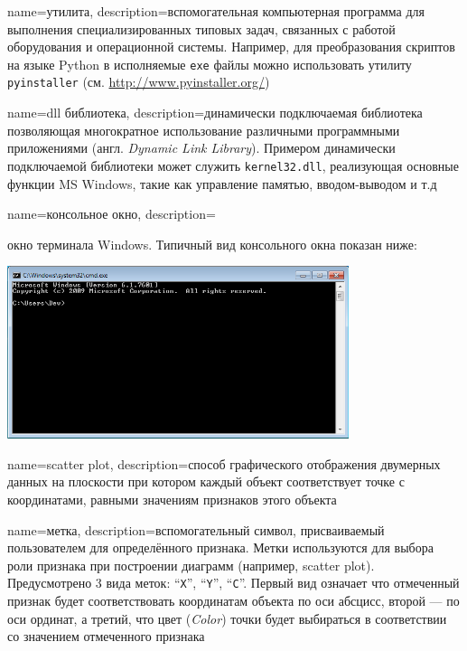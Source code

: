 {
	name=утилита,
	description={вспомогательная компьютерная программа для выполнения специализированных типовых задач, связанных с работой оборудования и операционной системы. Например, для преобразования скриптов на языке Python в исполняемые \texttt{exe} файлы можно использовать утилиту \texttt{pyinstaller} (см. \url{http://www.pyinstaller.org/})}
}

{
	name=dll библиотека,
	description={динамически подключаемая библиотека позволяющая многократное использование различными программными приложениями (англ. \textit{Dynamic Link Library}). Примером динамически подключаемой библиотеки может служить \texttt{kernel32.dll}, реализующая основные функции MS Windows, такие как управление памятью, вводом-выводом и т.д}
}

{
	name=консольное окно,
	description={окно терминала Windows. Типичный вид консольного окна показан ниже:
	\newline\begin{center}
		\includegraphics[width=0.75\textwidth]{img/terminalexample}
	\end{center}}
}

{
	name=scatter plot,
	description={способ графического отображения двумерных данных на плоскости при котором каждый объект соответствует точке с координатами, равными значениям признаков этого объекта}
}

{
	name=метка,
	description={вспомогательный символ, присваиваемый пользователем для  определённого признака. Метки используются для выбора роли признака при построении диаграмм (например, scatter plot). Предусмотрено 3 вида меток: ``\texttt{X}'', ``\texttt{Y}'', ``\texttt{C}''. Первый вид означает что отмеченный признак будет соответствовать координатам объекта по оси абсцисс, второй --- по оси ординат, а третий, что цвет (\textit{Color}) точки будет выбираться в соответствии со значением отмеченного признака}
}




